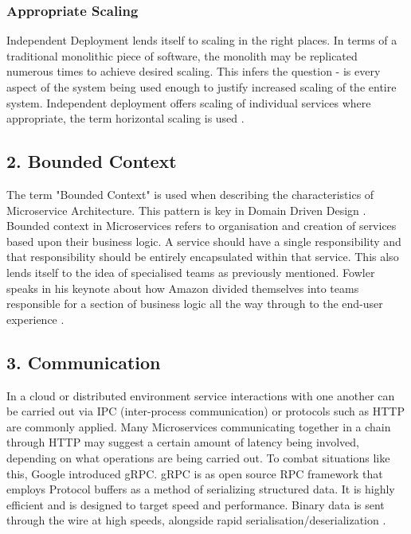 \subsubsection*{Appropriate Scaling}
Independent Deployment lends itself to scaling in the right places. In terms of a traditional monolithic piece of software, the monolith may be replicated numerous times to achieve desired scaling. This infers the question - is every aspect of the system being used enough to justify increased scaling of the entire system. Independent deployment offers scaling of individual services where appropriate, the term horizontal scaling is used \cite{MasteringChaosNetflix}.

\subsection*{ 2. Bounded Context }

The term "Bounded Context" is used when describing the characteristics of Microservice Architecture. This pattern is key in Domain Driven Design \cite{BoundedContext}. Bounded context in Microservices refers to organisation and creation of services based upon their business logic. A service should have a single responsibility and that responsibility should be entirely encapsulated within that service. This also lends itself to the idea of specialised teams as previously mentioned. Fowler speaks in his keynote about how Amazon divided themselves into teams responsible for a section of business logic all the way through to the end-user experience \cite{GOTOConference}. 

\subsection*{ 3. Communication }
In a cloud or distributed environment service interactions with one another can be carried out via IPC (inter-process communication) or protocols such as HTTP are commonly applied. Many Microservices communicating together in a chain through HTTP may suggest a certain amount of latency being involved, depending on what operations are being carried out. To combat situations like this, Google introduced gRPC\cite{gRPC}. gRPC is as open source RPC framework that employs Protocol buffers\cite{ProtocolBuffers} as a method of serializing structured data. It is highly efficient and is designed to target speed and performance. Binary data is sent through the wire at high speeds, alongside rapid serialisation/deserialization \cite{gRPCHackernoon}.

